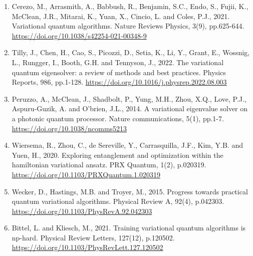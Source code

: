 \documentclass[a4paper,11pt]{article}
\begin{document}
\begin{enumerate}
\def\labelenumi{\arabic{enumi}.}

\item Cerezo, M., Arrasmith, A., Babbush, R., Benjamin, S.C., Endo, S., Fujii, K., McClean, J.R., Mitarai, K., Yuan, X., Cincio, L. and Coles, P.J., 2021. Variational quantum algorithms. Nature Reviews Physics, 3(9), pp.625-644. \url{https://doi.org/10.1038/s42254-021-00348-9}

\item Tilly, J., Chen, H., Cao, S., Picozzi, D., Setia, K., Li, Y., Grant, E., Wossnig, L., Rungger, I., Booth, G.H. and Tennyson, J., 2022. The variational quantum eigensolver: a review of methods and best practices. Physics Reports, 986, pp.1-128. \url{https://doi.org/10.1016/j.physrep.2022.08.003}


\item Peruzzo, A., McClean, J., Shadbolt, P., Yung, M.H., Zhou, X.Q., Love, P.J., Aspuru-Guzik, A. and O’brien, J.L., 2014. A variational eigenvalue solver on a photonic quantum processor. Nature communications, 5(1), pp.1-7. \url{https://doi.org/10.1038/ncomms5213}


\item Wiersema, R., Zhou, C., de Sereville, Y., Carrasquilla, J.F., Kim, Y.B. and Yuen, H., 2020. Exploring entanglement and optimization within the hamiltonian variational ansatz. PRX Quantum, 1(2), p.020319. \url{https://doi.org/10.1103/PRXQuantum.1.020319}

\item Wecker, D., Hastings, M.B. and Troyer, M., 2015. Progress towards practical quantum variational algorithms. Physical Review A, 92(4), p.042303. \url{https://doi.org/10.1103/PhysRevA.92.042303}



\item Bittel, L. and Kliesch, M., 2021. Training variational quantum algorithms is np-hard. Physical Review Letters, 127(12), p.120502. \url{https://doi.org/10.1103/PhysRevLett.127.120502}



\end{enumerate}
\end{document}
